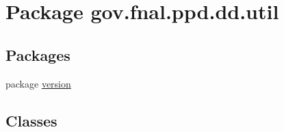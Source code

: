 \hypertarget{namespacegov_1_1fnal_1_1ppd_1_1dd_1_1util}{\section{Package gov.\-fnal.\-ppd.\-dd.\-util}
\label{namespacegov_1_1fnal_1_1ppd_1_1dd_1_1util}
}
\subsection*{Packages}
\begin{DoxyCompactItemize}
\item 
package \hyperlink{namespacegov_1_1fnal_1_1ppd_1_1dd_1_1util_1_1version}{version}
\end{DoxyCompactItemize}
\subsection*{Classes}
